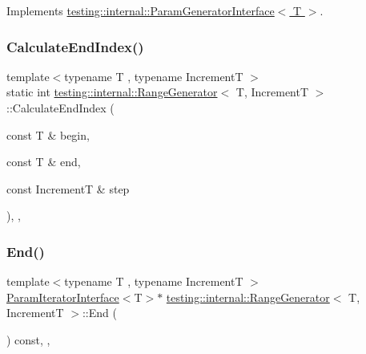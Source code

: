 Implements \hyperlink{classtesting_1_1internal_1_1ParamGeneratorInterface_ae1de83b16fe9a53c67778a026c6a9569}{testing\+::internal\+::\+Param\+Generator\+Interface$<$ T $>$}.

\mbox{\label{classtesting_1_1internal_1_1RangeGenerator_af617ad3b3e40bef967f1055dc7ae8ae6}} 
\subsubsection{\texorpdfstring{Calculate\+End\+Index()}{CalculateEndIndex()}}
{\footnotesize\ttfamily template$<$typename T , typename IncrementT $>$ \\
static int \hyperlink{classtesting_1_1internal_1_1RangeGenerator}{testing\+::internal\+::\+Range\+Generator}$<$ T, IncrementT $>$\+::Calculate\+End\+Index (\begin{DoxyParamCaption}\item[{const T \&}]{begin,  }\item[{const T \&}]{end,  }\item[{const IncrementT \&}]{step }\end{DoxyParamCaption})\hspace{0.3cm}{\ttfamily [inline]}, {\ttfamily [static]}, {\ttfamily [private]}}

\mbox{\label{classtesting_1_1internal_1_1RangeGenerator_ac112ca69567b9c47bf14554e0473e1e2}} 
\subsubsection{\texorpdfstring{End()}{End()}}
{\footnotesize\ttfamily template$<$typename T , typename IncrementT $>$ \\
\hyperlink{classtesting_1_1internal_1_1ParamIteratorInterface}{Param\+Iterator\+Interface}$<$T$>$$\ast$ \hyperlink{classtesting_1_1internal_1_1RangeGenerator}{testing\+::internal\+::\+Range\+Generator}$<$ T, IncrementT $>$\+::End (\begin{DoxyParamCaption}{ }\end{DoxyParamCaption}) const\hspace{0.3cm}{\ttfamily [inline]}, {\ttfamily [override]}, {\ttfamily [virtual]}}



